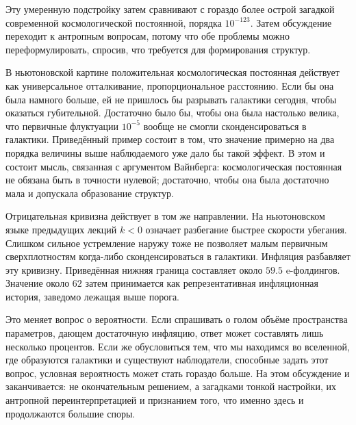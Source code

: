 \begin{classroomqa}
\end{classroomqa}

Эту умеренную подстройку затем сравнивают с гораздо более острой загадкой современной космологической постоянной, порядка \(10^{-123}\). Затем обсуждение переходит к антропным вопросам, потому что обе проблемы можно переформулировать, спросив, что требуется для формирования структур.

В ньютоновской картине положительная космологическая постоянная действует как универсальное отталкивание, пропорциональное расстоянию. Если бы она была намного больше, ей не пришлось бы разрывать галактики сегодня, чтобы оказаться губительной. Достаточно было бы, чтобы она была настолько велика, что первичные флуктуации \(10^{-5}\) вообще не смогли сконденсироваться в галактики. Приведённый пример состоит в том, что значение примерно на два порядка величины выше наблюдаемого уже дало бы такой эффект. В этом и состоит мысль, связанная с аргументом Вайнберга: космологическая постоянная не обязана быть в точности нулевой; достаточно, чтобы она была достаточно мала и допускала образование структур.

Отрицательная кривизна действует в том же направлении. На ньютоновском языке предыдущих лекций \(k<0\) означает разбегание быстрее скорости убегания. Слишком сильное устремление наружу тоже не позволяет малым первичным сверхплотностям когда-либо сконденсироваться в галактики. Инфляция разбавляет эту кривизну. Приведённая нижняя граница составляет около \(59.5\) e-фолдингов. Значение около \(62\) затем принимается как репрезентативная инфляционная история, заведомо лежащая выше порога.

Это меняет вопрос о вероятности. Если спрашивать о голом объёме пространства параметров, дающем достаточную инфляцию, ответ может составлять лишь несколько процентов. Если же обусловиться тем, что мы находимся во вселенной, где образуются галактики и существуют наблюдатели, способные задать этот вопрос, условная вероятность может стать гораздо больше. На этом обсуждение и заканчивается: не окончательным решением, а загадками тонкой настройки, их антропной переинтерпретацией и признанием того, что именно здесь и продолжаются большие споры.

